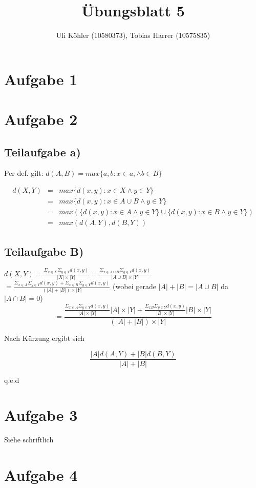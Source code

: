 \documentclass[a4paper,10pt,oneside,leqno]{scrartcl}
\title{Übungsblatt 5}
\author{Uli Köhler (10580373), Tobias Harrer (10575835)}
\begin{document}
\maketitle

\section*{Aufgabe 1}%

\section*{Aufgabe 2}%
\subsection*{Teilaufgabe a)}
Per def. gilt: $d(A,B) = max\{a, b:x\in a, \wedge b \in B\}$

\begin{align}
 d(X,Y) &=& max\{d(x,y):x\in X \wedge y \in Y\}\\
 &=& max\{d(x,y):x\in A\cup B \wedge y \in Y\}\\
 &=& max(\{d(x,y):x\in A \wedge y \in Y\} \cup \{d(x,y):x\in B \wedge y \in Y\})\\
 &=& max(d(A,Y), d(B,Y))
\end{align}

\subsection*{Teilaufgabe B)}
$d(X,Y) = \frac{\Sigma_{x \in X}\Sigma_{y \in Y}d(x,y)}{|X|\times |Y|}
=\frac{\Sigma_{x \in A\cup B}\Sigma_{y \in Y}d(x,y)}{|A\cup B|\times |Y|}$\\
$=\frac{\Sigma_{x \in A}\Sigma_{y \in Y}d(x,y) + \Sigma_{x \in B}\Sigma_{y \in Y}d(x,y)}{(|A| + |B|)\times |Y|}$
(wobei gerade $|A| + |B| = |A \cup B|$ da $|A \cap B| = 0$)\\

\[
 =\frac{\frac{\Sigma_{x \in A}\Sigma_{y \in Y}d(x,y)}{|A|\times |Y|} |A|\times|Y| + \frac{\Sigma_{x B}\Sigma_{y \in Y}d(x,y)}{|B|\times |Y|} |B|\times|Y|}{(|A|+|B|)\times |Y|}
\]

Nach Kürzung ergibt sich

\[
 \frac{|A|d(A,Y) + |B|d(B,Y)}{|A| + |B|}
\]

q.e.d


\section*{Aufgabe 3}%
Siehe schriftlich

\section*{Aufgabe 4}%
\end{document}
